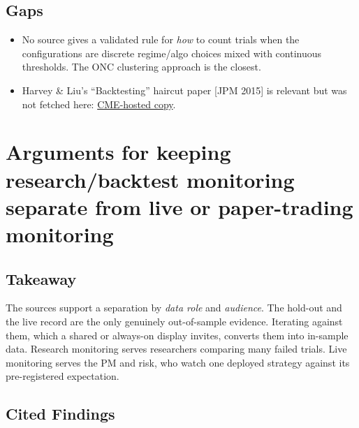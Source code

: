 \documentclass{article}
\begin{document}
\subsection{Gaps}

\begin{itemize}

\item No source gives a validated rule for \emph{how} to count trials when the configurations are discrete regime/\allowbreak{}algo choices mixed with continuous thresholds. The ONC clustering approach is the closest.

\item Harvey \& Liu's ``Backtesting'' haircut paper [JPM 2015] is relevant but was not fetched here: \href{https://www.cmegroup.com/content/dam/cmegroup/education/files/backtesting.pdf}{CME-hosted copy}.

\end{itemize}

\section{Arguments for keeping research/\allowbreak{}backtest monitoring separate from live or paper-trading monitoring}

\subsection{Takeaway}

The sources support a separation by \emph{data role} and \emph{audience}. The hold-out and the live record are the only genuinely out-of-sample evidence. Iterating against them, which a shared or always-on display invites, converts them into in-sample data. Research monitoring serves researchers comparing many failed trials. Live monitoring serves the PM and risk, who watch one deployed strategy against its pre-registered expectation.

\subsection{Cited Findings}
\end{document}
